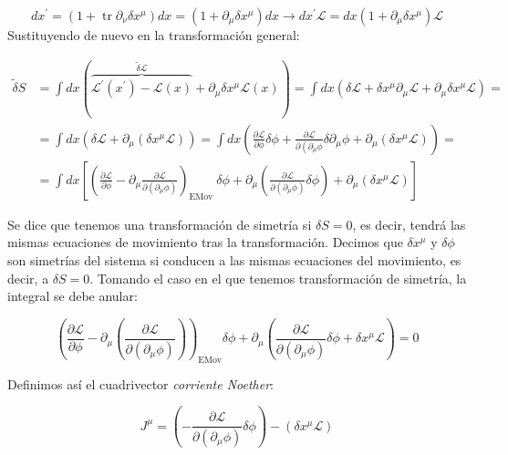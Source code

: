 \begin{equation}
d x^{\prime}=\left(1+\operatorname{tr} \partial_\nu \delta x^\mu\right) d x=\left(1+\partial_\mu \delta x^\mu\right) d x \rightarrow d x^{\prime} \mathcal{L}=d x\left(1+\partial_\mu \delta x^\mu\right) \mathcal{L}
\end{equation}
Sustituyendo de nuevo en la transformación general:

\begin{equation}
\begin{aligned}
\tilde{\delta} S & =\int d x(\overbrace{\mathcal{L}^{\prime}\left(x^{\prime}\right)-\mathcal{L}(x)}^{\tilde{\delta} \mathcal{L}}+\partial_\mu \delta x^\mu \mathcal{L}(x))=\int d x\left(\delta \mathcal{L}+\delta x^\mu \partial_\mu \mathcal{L}+\partial_\mu \delta x^\mu \mathcal{L}\right)= \\
& =\int d x\left(\delta \mathcal{L}+\partial_\mu\left(\delta x^\mu \mathcal{L}\right)\right)=\int d x\left(\frac{\partial \mathcal{L}}{\partial \phi} \delta \phi+\frac{\partial \mathcal{L}}{\partial\left(\partial_\mu \phi\right.} \delta \partial_\mu \phi+\partial_\mu\left(\delta x^\mu \mathcal{L}\right)\right)= \\
& =\int d x\left[\left(\frac{\partial \mathcal{L}}{\partial \phi}-\partial_\mu \frac{\partial \mathcal{L}}{\partial\left(\partial_\mu \phi\right)}\right)_{\text {EMov }} \delta \phi+\partial_\mu\left(\frac{\partial \mathcal{L}}{\partial\left(\partial_\mu \phi\right)} \delta \phi\right)+\partial_\mu\left(\delta x^\mu \mathcal{L}\right)\right]
\end{aligned}
\end{equation}

Se dice que tenemos una transformación de simetría si $ \delta S = 0 $, es decir, tendrá las mismas ecuaciones de movimiento tras la transformación. Decimos que $ \delta x^\mu $ y $ \delta \phi $ son simetrías del sistema si conducen a las mismas ecuaciones del movimiento, es decir, a $ \delta S = 0 $. Tomando el caso en el que tenemos transformación de simetría, la integral se debe anular:

$$
\left( \frac{\partial \mathcal{L}}{\partial \phi} - \partial_\mu \left( \frac{\partial \mathcal{L}}{\partial (\partial_\mu \phi)} \right) \right)_{\text{EMov}} \delta \phi + \partial_\mu \left( \frac{\partial \mathcal{L}}{\partial (\partial_\mu \phi)} \delta \phi + \delta x^\mu \mathcal{L} \right) = 0
$$

Definimos así el cuadrivector \textit{corriente Noether}:

$$
J^\mu = \left( - \frac{\partial \mathcal{L}}{\partial (\partial_\mu \phi)} \delta \phi \right) - \left( \delta x^\mu \mathcal{L} \right)
$$

